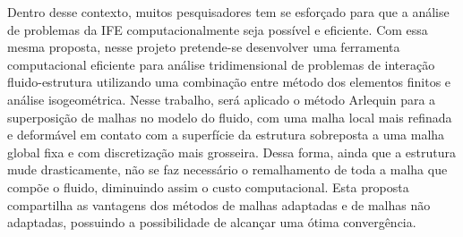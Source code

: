 \documentclass[tese_patricia.tex]{subfiles}
\begin{document}
Dentro desse contexto, muitos pesquisadores tem se esforçado para que a análise de problemas da IFE computacionalmente seja possível e eficiente. Com essa mesma proposta, nesse projeto pretende-se desenvolver uma ferramenta computacional eficiente para análise tridimensional de problemas de interação fluido-estrutura utilizando uma combinação entre método dos elementos finitos e análise isogeométrica.  Nesse trabalho, será aplicado o método Arlequin para a superposição de malhas no modelo do fluido, com uma malha local mais refinada e deformável em contato com a superfície da estrutura sobreposta a uma malha global fixa e com discretização mais grosseira. Dessa forma, ainda que a estrutura mude drasticamente, não se faz necessário o remalhamento de toda a malha que compõe o fluido, diminuindo assim o custo computacional. Esta proposta compartilha as vantagens dos métodos de malhas adaptadas e de malhas não adaptadas, possuindo a possibilidade de alcançar uma ótima convergência.
\end{document}
